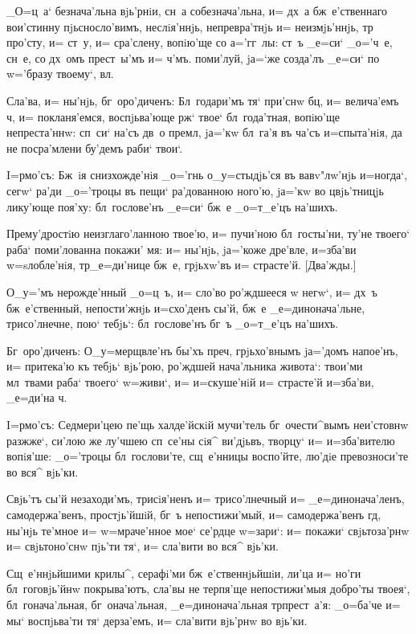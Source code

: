 _О=ц~а` безнача'льна вjь'рнiи, сн~а собезнача'льна, и= 
дх~а бж~е'ственнаго вои'стинну пjьсносло'вимъ, 
неслiя'ннjь, непревра'тнjь и= неизмjь'ннjь, тр 
про'сту, и= ст~у, и= сра'слену, вопiю'ще со а='гг~лы: 
ст~ъ _е=си` _о='ч~е, сн~е, со дх~омъ прест~ы'мъ и= 
ч'мъ. поми'луй, jа=`же созда'лъ _е=си` по w='бразу 
твоему`, вл.

Сла'ва, и= ны'нjь, бг~оро'диченъ: Бл~годари'мъ тя` 
при'снw бц, и= велича'емъ ч, и= покланя'емся, 
воспjьва'юще рж` твое` бл~года'тная, вопiю'ще 
непреста'ннw: сп~си` на'съ дв~о премл, jа='кw 
бл~га'я въ ча'съ и=спыта'нiя, да не посра'млени бу'демъ 
раби` твои`.


I=рмо'съ: Бж~iя снизхожде'нiя _о='гнь о_у=стыдjь'ся въ 
вавv"лw'нjь и=ногда`, сегw` ра'ди _о='троцы въ пещи` 
ра'дованною ного'ю, jа='кw во цвjь'тницjь лику'юще 
поя'ху: бл~гослове'нъ _е=си` бж~е _о=т_е'цъ на'шихъ.

Прему'дростiю неизглаго'ланною твое'ю, и= пучи'ною 
бл~госты'ни, ту'не твоего` раба` поми'лованна покажи' мя: 
и= ны'нjь, jа='коже дре'вле, и=зба'ви w=sлобле'нiя, 
тр _е=ди'нице бж~е, грjьхw'въ и= страсте'й. 
[Два'жды.]

О_у='мъ нерожде'нный _о=ц~ъ, и= сло'во ро'ждшееся w\т 
негw`, и= дх~ъ бж~е'ственный, непости'жнjь и=схо'денъ 
сы'й, бж~е _е=динонача'льне, трисо'лнечне, пою` тебjь`: 
бл~гослове'нъ бг~ъ _о=т_е'цъ на'шихъ.

Бг~оро'диченъ: О_у=мерщвле'нъ бы'хъ преч, 
грjьхо'внымъ jа='домъ напое'нъ, и= притека'ю къ тебjь` 
вjь'рою, ро'ждшей нача'льника живота`: твои'ми мл~твами 
раба` твоего` w=живи`, и= и=скуше'нiй и= страсте'й 
и=зба'ви, _е=ди'на ч.


I=рмо'съ: Седмери'цею пе'щь халде'йскiй мучи'тель 
бг~очести^вымъ неи'стовнw разжже`, си'лою же лу'чшею 
сп~се'ны сiя^ ви'дjьвъ, творцу` и= и=зба'вителю вопiя'ше: 
_о='троцы бл~гослови'те, сщ~е'нницы воспо'йте, лю'дiе 
превозноси'те во вся^ вjь'ки.

Свjь'тъ сы'й незаходи'мъ, трисiя'ненъ и= трисо'лнечный 
и= _е=динонача'ленъ, самодержа'венъ, простjь'йшiй, бг~ъ 
непостижи'мый, и= самодержа'венъ гд, ны'нjь те'мное и= 
w=мраче'нное мое` се'рдце w=зари`: и= покажи` 
свjьтоза'рнw и= свjьтоно'снw пjь'ти тя`, и= сла'вити во 
вся^ вjь'ки.

Сщ~е'ннjьйшими крилы^, серафi'ми бж~е'ственнjьйшiи, 
ли'ца и= но'ги бл~гоговjь'йнw покрыва'ютъ, сла'вы не 
терпя'ще непостижи'мыя добро'ты твоея`, бл~гонача'льная, 
бг~онача'льная, _е=динонача'льная тр прест~а'я: 
_о=ба'че и= мы` воспjьва'ти тя` дерза'емъ, и= сла'вити 
вjь'рнw во вjь'ки.

